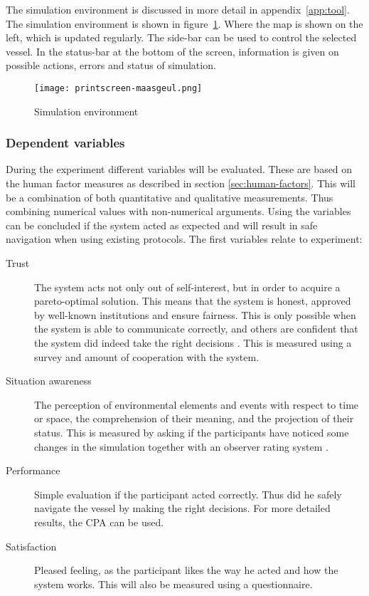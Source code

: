 The simulation environment is discussed in more detail in appendix~\ref{app:tool}. The simulation environment is shown in figure~\ref{fig:printscreen-tool}. Where the map is shown on the left, which is updated regularly. The side-bar can be used to control the selected vessel. In the status-bar at the bottom of the screen, information is given on possible actions, errors and status of simulation.

\begin{figure}[hbp]
	\centering
	\texttt{[image: printscreen-maasgeul.png]}
	\caption{Simulation environment}
	\label{fig:printscreen-tool}
\end{figure}


\subsubsection{Dependent variables}
During the experiment different variables will be evaluated. These are based on the human factor measures as described in section \ref{sec:human-factors}. This will be a combination of both quantitative and qualitative measurements. Thus combining numerical values with non-numerical arguments. 
Using the variables can be concluded if the system acted as expected and will result in safe navigation when using existing protocols. The first variables relate to experiment:
\begin{description}
	\item [Trust] The system acts not only out of self-interest, but in order to acquire a pareto-optimal solution. This means that the system is honest, approved by well-known institutions and ensure fairness. This is only possible when the system is able to communicate correctly, and others are confident that the system did indeed take the right decisions \cite{Ozawa2013}.
	This is measured using a survey and amount of cooperation with the system.
	\item [Situation awareness] The perception of environmental elements and events with respect to time or space, the comprehension of their meaning, and the projection of their status. This is measured by asking if the participants have noticed some changes in the simulation together with an observer rating system \cite{Naderpour2016}.
	\item [Performance] Simple evaluation if the participant acted correctly. Thus did he safely navigate the vessel by making the right decisions. For more detailed results, the \acf{CPA} can be used.
	\item [Satisfaction] Pleased feeling, as the participant likes the way he acted and how the system works. This will also be measured using a questionnaire.
\end{description}

